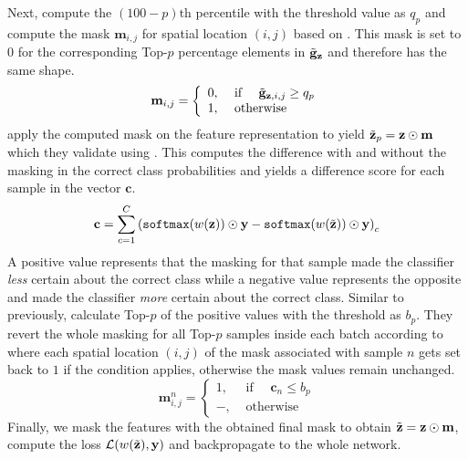 Next, \citet{huang2020selfchallenging} compute the $(100-p)\mathrm{th}$ percentile with the threshold value as $q_p$ and compute the mask $\mathbf{m}_{i,j}$ for spatial location $(i,j)$ based on . This mask is set to $0$ for the corresponding Top-$p$ percentage elements in $\Tilde{\mathbf{g}}_\mathbf{z}$ and therefore has the same shape. 
\begin{equation}
\mathbf{m}_{i,j}=\left\{\begin{array}{ll}
0, & \text { if } \quad \Tilde{\mathbf{g}}_{\mathbf{z}, i, j} \geq q_{p} \\
1, & \text { otherwise }
\end{array}\right.
\label{eq:Masking}
\end{equation}
\citet{huang2020selfchallenging} apply the computed mask on the feature representation to yield $\Tilde{\mathbf{z}}_p = \mathbf{z} \odot \mathbf{m}$ which they validate using . This computes the difference with and without the masking in the correct class probabilities and yields a difference score for each sample in the vector $\mathbf{c}$.  
\begin{equation}
   \mathbf{c} = \sum_{c=1}^C  \left(\mathtt{softmax}(w(\mathbf{z})) \odot \mathbf{y} - \mathtt{softmax}(w(\Tilde{\mathbf{z}})) \odot \mathbf{y} \right)_c
   \label{eq:changeval}
\end{equation}
A positive value represents that the masking for that sample made the classifier \emph{less} certain about the correct class while a negative value represents the opposite and made the classifier \emph{more} certain about the correct class. Similar to previously, \citet{huang2020selfchallenging} calculate Top-$p$ of the positive values with the threshold as $b_p$. They revert the whole masking for all Top-$p$ samples inside each batch according to  where each spatial location $(i,j)$ of the mask associated with sample $n$ gets set back to $1$ if the condition applies, otherwise the mask values remain unchanged.
\begin{equation}
    \mathbf{m}^n_{i,j}=\left\{\begin{array}{ll}
1, & \text { if } \quad \mathbf{c}_n \leq b_{p} \\
-, & \text { otherwise }
\end{array}\right.
\label{eq:Masking-Reversion-RSC}
\end{equation}
Finally, we mask the features with the obtained final mask to obtain $\Tilde{\mathbf{z}} = \mathbf{z} \odot \mathbf{m}$, compute the loss $\mathcal{L}(w(\Tilde{\mathbf{z}}), \mathbf{y})$ and backpropagate to the whole network.

